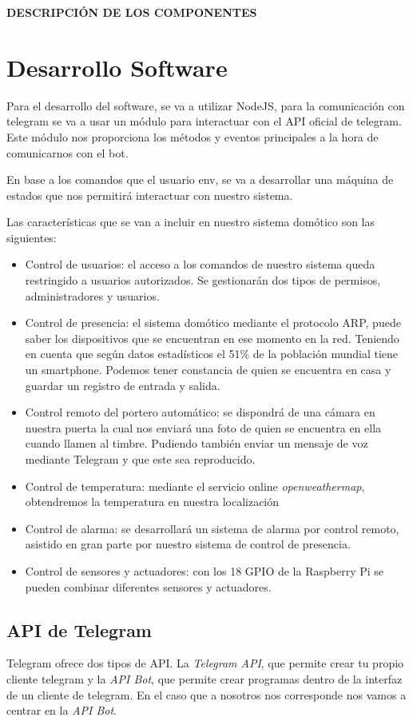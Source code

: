 \documentclass[10pt,journal,compsoc]{IEEEtran}
\begin{document}
\textbf{DESCRIPCIÓN DE LOS COMPONENTES}

\section{Desarrollo Software}
Para el desarrollo del software, se va a utilizar NodeJS, para la comunicación con telegram se va a 
usar un módulo para interactuar con el API oficial de telegram. Este módulo nos proporciona los 
métodos y eventos principales a la hora de comunicarnos con el bot.

En base a los comandos que el usuario env, se va a desarrollar una máquina de estados que nos 
permitirá interactuar con nuestro sistema.

Las características que se van a incluir en nuestro sistema domótico son las siguientes:
\begin{itemize}
\item Control de usuarios: el acceso a los comandos de nuestro sistema queda restringido a 
usuarios autorizados. Se gestionarán dos tipos de permisos, administradores y usuarios.
\item Control de presencia: el sistema domótico mediante el protocolo ARP, puede saber los 
dispositivos que se encuentran en ese momento en la red. Teniendo en cuenta que según datos 
estadísticos el 51\% de la población mundial tiene un smartphone. Podemos tener constancia de 
quien se encuentra en casa y guardar un registro de entrada y salida.
\item Control remoto del portero automático: se dispondrá de una cámara en nuestra puerta la cual 
nos enviará una foto de quien se encuentra en ella cuando llamen al timbre. Pudiendo también enviar 
un mensaje de voz mediante Telegram y que este sea reproducido.
\item Control de temperatura: mediante el servicio online \textit{openweathermap}, obtendremos la 
temperatura en nuestra localización
\item Control de alarma: se desarrollará un sistema de alarma por control remoto, asistido en 
gran parte por nuestro sistema de control de presencia.
\item Control de sensores y actuadores: con los 18 GPIO de la Raspberry Pi se pueden combinar 
diferentes sensores y actuadores.
\end{itemize}

\subsection{API de Telegram}
Telegram ofrece dos tipos de API. La \textit{Telegram API}, que permite crear tu propio cliente 
telegram y la \textit{API Bot}, que permite crear programas dentro de la interfaz de un 
cliente de telegram. En el caso que a nosotros nos corresponde nos vamos a 
centrar en la \textit{API Bot}. 
\end{document}
